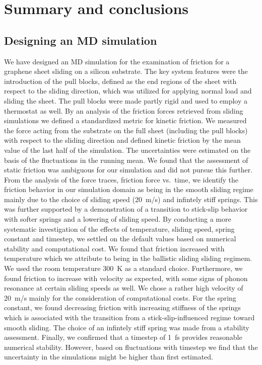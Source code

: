 \section{Summary and conclusions}

\subsection{Designing an MD simulation}
We have designed an \acrshort{MD} simulation for the examination of friction for
a graphene sheet sliding on a silicon substrate. The key system features were
the introduction of the pull blocks, defined as the end regions of the sheet
with respect to the sliding direction, which was utilized for applying normal
load and sliding the sheet. The pull blocks were made partly rigid and used to
employ a thermostat as well. By an analysis of the friction forces retrieved from sliding simulations we defined a standardized metric for kinetic friction. We measured the force acting from the substrate on the full sheet (including the pull blocks) with respect to the sliding direction and defined kinetic friction by the mean value of the last half of the simulation. The uncertainties were estimated on the basis of the fluctuations in the running mean.  We found that the assessment of static friction was ambiguous for our simulation and did not pursue this further. From the analysis of the
force traces, friction force vs.\ time, we identify the friction behavior in our
simulation domain as being in the smooth sliding regime mainly due to the choice of sliding speed (\SI{20}{m/s}) and infintely stiff springs. This was further supported by a demonstration of a transition to stick-slip behavior with softer springs and a lowering of sliding speed. By conducting a more systematic investigation of the
effects of temperature, sliding speed, spring constant and timestep, we settled
on the default values based on numerical stability and computational cost. We
found that friction increased with temperature which we attribute to being in the ballistic sliding sliding regimem. We used the room temperature \SI{300}{K} as a standard choice. Furthermore, we found friction to increase with velocity as expected, with some signs of phonon resonance at certain sliding speeds as well. We chose a rather high velocity of \SI{20}{m/s} mainly for the consideration of computational costs. For the spring constant, we found decreasing friction with increasing stiffness of the springs which is associated with the transition from a stick-slip-influenced regime toward smooth sliding. The choice of an infintely stiff spring was made from a stability assessment. Finally, we confirmed that a timestep of \SI{1}{fs} provides reasonable numerical stability. However, based on fluctuations with timestep we find that the uncertainty in the simulations might be higher than first estimated.



